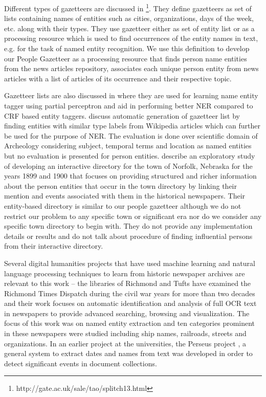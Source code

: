 
Different types of gazetteers are discussed in \footnote{http://gate.ac.uk/sale/tao/splitch13.html}. They define gazetteers as set of lists containing names of entities such as cities, organizations, days of the week, etc. along with their types. They use gazetteer either as set of entity list or as a processing resource which is used to find occurrences of the entity names in text, e.g. for the task of named entity recognition. We use this definition to develop our People Gazetteer as a processing resource that finds person name entities from the news articles repository, associates each unique person entity from news articles with a list of articles of its occurrence and their respective topic.

Gazetteer lists are also discussed in \cite{carlson2009learning} where they are used for learning name entity tagger using partial perceptron and aid in performing better NER compared to CRF based entity taggers.
\cite{zhang2009novel} discuss automatic generation of gazetteer list by finding entities with similar type labels from Wikipedia articles which can further be used for the purpose of NER. The evaluation is done over scientific domain of Archeology considering subject, temporal terms and location as named entities but no evaluation is presented for person entities. \cite{allen2013toward} describe an exploratory study of developing an interactive directory for the town of Norfolk, Nebraska for the years 1899 and 1900 that focuses on providing structured and richer information about the person entities that occur in the town directory by linking their mention and events associated with them in the historical newspapers. Their entity-based directory is similar to our people gazetteer although we do not restrict our problem to any specific town or significant era nor do we consider any specific town directory to begin with. They do not provide any implementation details or results and do not talk about procedure of finding influential persons from their interactive directory. 

Several digital humanities projects that have used machine learning and natural language processing techniques to learn from historic newspaper archives are relevant to this work -- the libraries of Richmond and Tufts have examined the Richmond Times Dispatch during the civil war years for more than two decades and their work focuses on automatic identification and analysis of full OCR text in newspapers to provide advanced searching, browsing and visualization\cite{crane2006challenge}. The focus of this work was on named entity extraction and ten categories prominent in these newspapers were studied including ship names, railroads, streets and organizations. In an earlier project at the universities, the Perseus project \cite{smith2002detectinga, smith2002detectingb, smith2001disambiguating}, a general system to extract dates and names from text was developed in order to detect significant events in document collections. 

